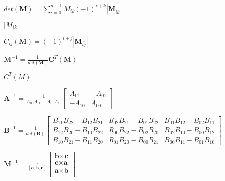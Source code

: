 \documentclass{article}
\def\lthtmlcheckvsize{\ifdim\ht\sizebox<\vsize 
  \ifdim\wd\sizebox<\hsize\expandafter\hfill\fi \expandafter\vfill
  \else\expandafter\vss\fi}%
\begin{document}
{\newpage\clearpage
{}%
$ det(\textbf{M}) = \sum\limits_{i=0}^{n-1} M_{ik}(-1)^{i+k}|\textbf{M}_{\bar{ik}}| $%
\lthtmlindisplaymathZ
\lthtmlcheckvsize\clearpage}

{\newpage\clearpage
{}%
$ |M_{ik}|$%
\lthtmlindisplaymathZ
\lthtmlcheckvsize\clearpage}

{\newpage\clearpage
{}%
$ C_{ij}(\textbf{M}) = (-1)^{i+j}|\textbf{M}_{\bar{ij}}|$%
\lthtmlindisplaymathZ
\lthtmlcheckvsize\clearpage}

{\newpage\clearpage
{}%
$ \textbf{M}^{-1} = \frac{1}{det(\textbf{M})} \textbf{C}^T(\textbf{M})$%
\lthtmlindisplaymathZ
\lthtmlcheckvsize\clearpage}

{\newpage\clearpage
{}%
$ C^T(M) =$%
\lthtmlindisplaymathZ
\lthtmlcheckvsize\clearpage}

{\newpage\clearpage
{}%
$ \textbf{A}^{-1} = \frac{1}{A_{00}A_{11} - A_{01}A_{10}} 
\begin{bmatrix}
A_{11} & -A_{01} \\
-A_{10} & A_{00}
\end{bmatrix}$%
\lthtmlindisplaymathZ
\lthtmlcheckvsize\clearpage}

{\newpage\clearpage
{}%
$ \textbf{B}^{-1} = \frac{1}{det(\textbf{B})} 
\begin{bmatrix}
B_{11}B_{22} - B_{12}B_{21} & B_{02}B_{21} - B_{01}B_{22} & B_{01}B_{12} - B_{02}B_{11} \\
B_{12}B_{20} - B_{10}B_{22} & B_{00}B_{22} - B_{02}B_{20} & B_{02}B_{10} - B_{00}B_{12} \\
B_{10}B_{21} - B_{11}B_{20} & B_{01}B_{20} - B_{00}B_{21} & B_{00}B_{11} - B_{01}B_{10}
\end{bmatrix} $%
\lthtmlindisplaymathZ
\lthtmlcheckvsize\clearpage}

{\newpage\clearpage
{}%
$ \textbf{M}^{-1} = \frac{1}{[\textbf{a},\textbf{b},\textbf{c}]} 
\begin{bmatrix}
\textbf{b} \times \textbf{c} \\
\textbf{c} \times \textbf{a} \\
\textbf{a} \times \textbf{b} \\
\end{bmatrix}
$%
\lthtmlindisplaymathZ
\lthtmlcheckvsize\clearpage}
\end{document}
